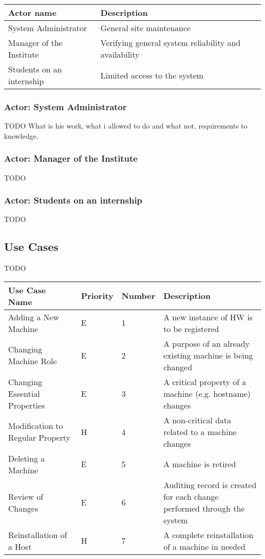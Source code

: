 \documentclass[12pt]{article}
\begin{document}
\begin{table}[!h]
	\begin{tabular}{| l | l |}
		\hline
		\textbf{Actor name}		& \textbf{Description}\\
		\hline
		System Administrator	& General site maintenance\\
		\hline
		Manager of the Institute	& Verifying general system reliability and availability\\
		\hline
		Students on an internship	& Limited access to the system\\
		\hline
	\end{tabular}
	\label{tab:Actors}
\end{table}

\subsubsection{Actor: System Administrator}
TODO What is his work, what i allowed to do and what not, requirements to knowledge.

\subsubsection{Actor: Manager of the Institute}
TODO

\subsubsection{Actor: Students on an internship}
TODO


\subsection{Use Cases}

TODO

\begin{table}[!h]
	\begin{tabular}{| l | l | l | l |}
		\hline
		\textbf{Use Case Name} & \textbf{Priority} & \textbf{Number} & \textbf{Description}\\
        \hline
        Adding a New Machine & E & 1 & A new instance of HW is to be registered\\
        \hline
        Changing Machine Role & E & 2 & A purpose of an already existing machine is being changed\\
        \hline
        Changing Essential Properties & E & 3 & A critical property of a machine (e.g. hostname) changes\\
        \hline
        Modification to Regular Property & H & 4 & A non-critical data related to a machine changes\\
        \hline
        Deleting a Machine & E & 5 & A machine is retired\\
        \hline
        Review of Changes & E & 6 & Auditing record is created for each change performed through the system\\
        \hline
        Reinstallation of a Host & H & 7 & A complete reinstallation of a machine in needed\\
		\hline
	\end{tabular}
	\label{tab:UseCases}
\end{table}
\end{document}
